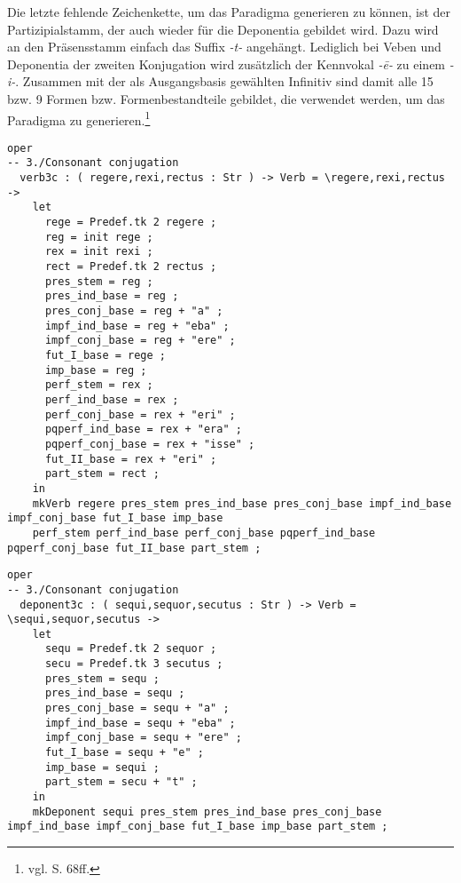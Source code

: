 Die letzte fehlende Zeichenkette, um das Paradigma generieren zu können, ist der Partizipialstamm, der auch wieder für die Deponentia gebildet wird. Dazu wird an den Präsensstamm einfach das Suffix \textit{-t-} angehängt. Lediglich bei Veben und Deponentia der zweiten Konjugation wird zusätzlich der Kennvokal \textit{-ē-} zu einem \textit{-i-}. Zusammen mit der als Ausgangsbasis gewählten Infinitiv sind damit alle 15 bzw. 9 Formen bzw. Formenbestandteile gebildet, die verwendet werden, um das Paradigma zu generieren.\footnote{vgl. \cite{BAYER-LINDAUER1994} S. 68ff.} \par
\begin{lstlisting}[float=h!tp,caption={Bildung der Wortstämme und -stöcke für Verben der dritten Konjugation mit konsonantischem Stamm (vgl. \textbf{MorphoLat.gf})},label={GF-Morpho-Verb3c},basicstyle=\small]
oper
-- 3./Consonant conjugation
  verb3c : ( regere,rexi,rectus : Str ) -> Verb = \regere,rexi,rectus ->
    let
      rege = Predef.tk 2 regere ;
      reg = init rege ;
      rex = init rexi ;
      rect = Predef.tk 2 rectus ;
      pres_stem = reg ;
      pres_ind_base = reg ;
      pres_conj_base = reg + "a" ;
      impf_ind_base = reg + "eba" ;
      impf_conj_base = reg + "ere" ;
      fut_I_base = rege ;
      imp_base = reg ;
      perf_stem = rex ;
      perf_ind_base = rex ;
      perf_conj_base = rex + "eri" ;
      pqperf_ind_base = rex + "era" ;
      pqperf_conj_base = rex + "isse" ;
      fut_II_base = rex + "eri" ;
      part_stem = rect ;
    in
    mkVerb regere pres_stem pres_ind_base pres_conj_base impf_ind_base impf_conj_base fut_I_base imp_base
    perf_stem perf_ind_base perf_conj_base pqperf_ind_base pqperf_conj_base fut_II_base part_stem ;
\end{lstlisting}
\begin{lstlisting}[float=h!tp,caption={Bildung der Wortstämme und -stöcke für Deponentia der dritten Konjugation mit konsonantischem Stamm (vgl. \textbf{MorphoLat.gf})},label={GF-Morpho-Deponent3c},basicstyle=\small]
oper
-- 3./Consonant conjugation
  deponent3c : ( sequi,sequor,secutus : Str ) -> Verb = \sequi,sequor,secutus ->
    let
      sequ = Predef.tk 2 sequor ;
      secu = Predef.tk 3 secutus ; 
      pres_stem = sequ ;
      pres_ind_base = sequ ;
      pres_conj_base = sequ + "a" ;
      impf_ind_base = sequ + "eba" ;
      impf_conj_base = sequ + "ere" ;
      fut_I_base = sequ + "e" ;
      imp_base = sequi ;
      part_stem = secu + "t" ;
    in
    mkDeponent sequi pres_stem pres_ind_base pres_conj_base impf_ind_base impf_conj_base fut_I_base imp_base part_stem ;
\end{lstlisting}

